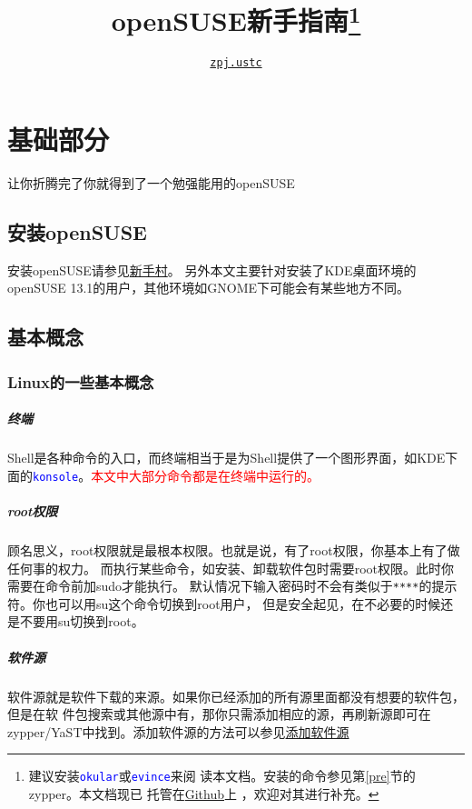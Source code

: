 \documentclass[10pt,openany]{book}
\newcommand{\command}[1]{\texttt{\textcolor{blue}{#1}}}
\newcommand{\soft}[1]{\texttt{\textcolor{blue}{#1}}}
\begin{document}
\title{openSUSE新手指南\thanks{建议安装\command{okular}或\command{evince}来阅
读本文档。安装的命令参见第\ref{pre}节的zypper。本文档现已
托管在\href{https://github.com/zpj-ustc/openSUSE-novice-guide}{Github}上
，欢迎对其进行补充。}}
\author{\href{mailto:zpj.ustc@gmail.com}{\texttt{zpj.ustc}}}
\maketitle
\tableofcontents
\newpage
\chapter{基础部分}
让你折腾完了你就得到了一个勉强能用的openSUSE
\section{安装openSUSE}
安装openSUSE请参见\href{https://zh.opensuse.org/%E6%96%B0%E6%89%8B%E6%9D%91}{新手村}。
另外本文主要针对安装了KDE桌面环境的openSUSE 13.1的用户，其他环境如GNOME下可能会有某些地方不同。

\section{基本概念}
\subsection{Linux的一些基本概念}
\paragraph{终端} Shell是各种命令的入口，而终端相当于是为Shell提供了一个图形界面，如KDE下面的\soft{konsole}。\textcolor{red}{本文中大部分命令都是在终端中运行的。}

\paragraph{root权限} 顾名思义，root权限就是最根本权限。也就是说，有了root权限，你基本上有了做任何事的权力。
而执行某些命令，如安装、卸载软件包时需要root权限。此时你需要在命令前加sudo才能执行。
默认情况下输入密码时不会有类似于\texttt{****}的提示符。你也可以用su这个命令切换到root用户，
但是安全起见，在不必要的时候还是不要用su切换到root。

\paragraph{软件源} 软件源就是软件下载的来源。如果你已经添加的所有源里面都没有想要的软件包，但是在软
件包搜索或其他源中有，那你只需添加相应的源，再刷新源即可在zypper/YaST中找到。添加软件源的方法可以参见\href{https://zh.opensuse.org/SDB:%E6%B7%BB%E5%8A%A0%E8%BD%AF%E4%BB%B6%E6%BA%90}{添加软件源}
\end{document}

